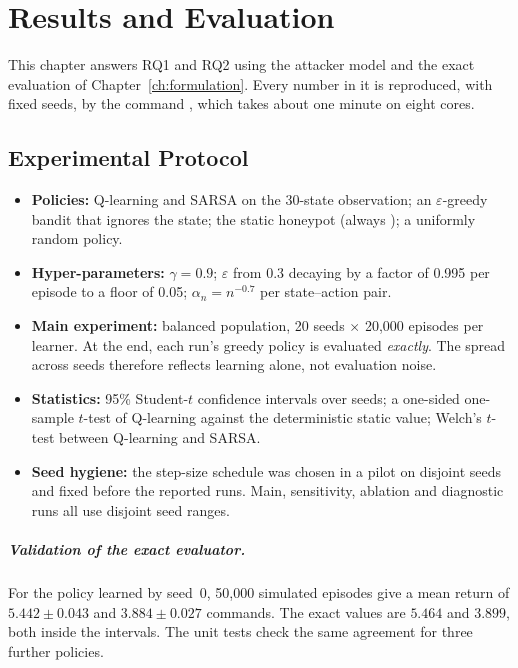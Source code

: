 \chapter{Results and Evaluation}
\label{ch:results}

This chapter answers RQ1 and RQ2 using the attacker model and the exact evaluation of
Chapter~\ref{ch:formulation}. Every number in it is reproduced, with fixed seeds, by the
command , which takes about one minute on eight cores.

\section{Experimental Protocol}

\begin{itemize}
  \item \textbf{Policies:} Q-learning and SARSA on the 30-state observation; an $\varepsilon$-greedy
    bandit that ignores the state; the static honeypot (always ); a uniformly random policy.
  \item \textbf{Hyper-parameters:} $\gamma = 0.9$; $\varepsilon$ from 0.3 decaying by a factor
    of 0.995 per episode to a floor of 0.05; $\alpha_n = n^{-0.7}$ per state--action pair.
  \item \textbf{Main experiment:} balanced population, 20 seeds $\times$ 20{,}000 episodes per
    learner. At the end, each run's greedy policy is evaluated \emph{exactly}. The spread across
    seeds therefore reflects learning alone, not evaluation noise.
  \item \textbf{Statistics:} 95\% Student-$t$ confidence intervals over seeds; a one-sided
    one-sample $t$-test of Q-learning against the deterministic static value; Welch's $t$-test
    between Q-learning and SARSA.
  \item \textbf{Seed hygiene:} the step-size schedule was chosen in a pilot on disjoint seeds
    and fixed before the reported runs. Main, sensitivity, ablation and diagnostic runs all use
    disjoint seed ranges.
\end{itemize}

\paragraph{Validation of the exact evaluator.} For the policy learned by seed~0, 50{,}000
simulated episodes give a mean return of $5.442 \pm 0.043$ and $3.884 \pm 0.027$ commands. The
exact values are $5.464$ and $3.899$, both inside the intervals. The unit tests check the same
agreement for three further policies.

